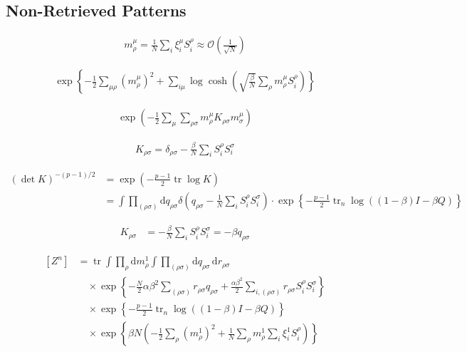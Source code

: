 \documentclass{article}
\begin{document}
\subsection{Non-Retrieved Patterns}

\begin{align*}
m_{\rho}^{\mu} = \frac{1}{N} \sum_i \xi_i^\mu S_i^\rho \approx \mathcal{O}\left( \frac{1}{\sqrt{N}} \right)\tag{7.20}
\end{align*}

\begin{align*}
\exp \left\{ -\frac{1}{2} \sum_{\mu \rho} \left( m_{\rho}^{\mu} \right)^2 + \sum_{i \mu} \log \cosh \left( \sqrt{\frac{\beta}{N}} \sum_{\rho} m_{\rho}^{\mu} S_i^\rho \right) \right\}\tag{7.21}
\end{align*}

\begin{align*}
\exp \left(-\frac{1}{2} \sum_{\mu} \sum_{\rho \sigma} m_{\rho}^{\mu} K_{\rho \sigma} m_{\sigma}^{\mu}\right)\tag{7.22}
\end{align*}

\begin{align*}
K_{\rho \sigma} = \delta_{\rho \sigma} - \frac{\beta}{N} \sum_{i} S_i^\rho S_i^\sigma\tag{7.23}
\end{align*}

\begin{align*}
(\operatorname{det} K)^{-(p-1)/2} & = \exp \left(-\frac{p-1}{2} \operatorname{tr} \log K\right) \\
& = \int \prod_{(\rho \sigma)} \mathrm{d} q_{\rho \sigma} \delta\left(q_{\rho \sigma}-\frac{1}{N} \sum_{i} S_{i}^{\rho} S_{i}^{\sigma}\right) \cdot \exp \left\{ -\frac{p-1}{2} \operatorname{tr}_{n} \log \left( (1-\beta) I - \beta Q \right) \right\}
\tag{7.24}
\end{align*}

\begin{align*}
K_{\rho \sigma} &= -\frac{\beta}{N} \sum_{i} S_{i}^{\rho} S_{i}^{\sigma} = -\beta q_{\rho \sigma}
\tag{7.25}
\end{align*}

\begin{align*}
\left[Z^{n}\right] &= \operatorname{tr} \int \prod_{\rho} \mathrm{d}m_{\rho}^{1} \int \prod_{(\rho \sigma)} \mathrm{d}q_{\rho \sigma} \, \mathrm{d}r_{\rho \sigma} \\
& \quad \times \exp\left\{-\frac{N}{2} \alpha \beta^2 \sum_{(\rho \sigma)} r_{\rho \sigma} q_{\rho \sigma} + \frac{\alpha \beta^2}{2} \sum_{i,(\rho \sigma)} r_{\rho \sigma} S_{i}^{\rho} S_{i}^{\sigma}\right\} \\
& \quad \times \exp\left\{-\frac{p-1}{2} \operatorname{tr}_{n} \log\left((1-\beta) I - \beta Q\right)\right\} \\
& \quad \times \exp\left\{\beta N \left( -\frac{1}{2} \sum_{\rho} \left(m_{\rho}^{1}\right)^2 + \frac{1}{N} \sum_{\rho} m_{\rho}^{1} \sum_{i} \xi_{i}^{1} S_{i}^{\rho} \right)\right\}
\tag{7.26}
\end{align*}
\end{document}
